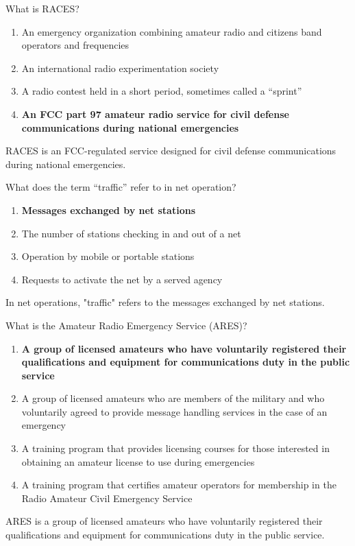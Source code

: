 \begin{tcolorbox}[colback=gray!10!white,colframe=black!75!black,title={T2C04}]
    What is RACES?
    \begin{enumerate}[label=\Alph*),noitemsep]
        \item An emergency organization combining amateur radio and citizens band operators and frequencies
        \item An international radio experimentation society
        \item A radio contest held in a short period, sometimes called a “sprint”
        \item \textbf{An FCC part 97 amateur radio service for civil defense communications during national emergencies}
    \end{enumerate}
\end{tcolorbox}
RACES is an FCC-regulated service designed for civil defense communications during national emergencies.

\begin{tcolorbox}[colback=gray!10!white,colframe=black!75!black,title={T2C05}]
    What does the term “traffic” refer to in net operation?
    \begin{enumerate}[label=\Alph*),noitemsep]
        \item \textbf{Messages exchanged by net stations}
        \item The number of stations checking in and out of a net
        \item Operation by mobile or portable stations
        \item Requests to activate the net by a served agency
    \end{enumerate}
\end{tcolorbox}
In net operations, "traffic" refers to the messages exchanged by net stations.

\begin{tcolorbox}[colback=gray!10!white,colframe=black!75!black,title={T2C06}]
    What is the Amateur Radio Emergency Service (ARES)?
    \begin{enumerate}[label=\Alph*),noitemsep]
        \item \textbf{A group of licensed amateurs who have voluntarily registered their qualifications and equipment for communications duty in the public service}
        \item A group of licensed amateurs who are members of the military and who voluntarily agreed to provide message handling services in the case of an emergency
        \item A training program that provides licensing courses for those interested in obtaining an amateur license to use during emergencies
        \item A training program that certifies amateur operators for membership in the Radio Amateur Civil Emergency Service
    \end{enumerate}
\end{tcolorbox}
ARES is a group of licensed amateurs who have voluntarily registered their qualifications and equipment for communications duty in the public service.

